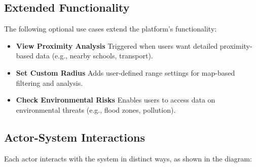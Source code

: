 \subsection{Extended Functionality}

The following optional use cases extend the platform’s functionality:

\begin{itemize}
	\item \textbf{View Proximity Analysis}  
	      Triggered when users want detailed proximity-based data (e.g., nearby schools, transport).
	      
	\item \textbf{Set Custom Radius}  
	      Adds user-defined range settings for map-based filtering and analysis.
	      
	\item \textbf{Check Environmental Risks}  
	      Enables users to access data on environmental threats (e.g., flood zones, pollution).
\end{itemize}

\subsection{Actor-System Interactions}

Each actor interacts with the system in distinct ways, as shown in the diagram:

